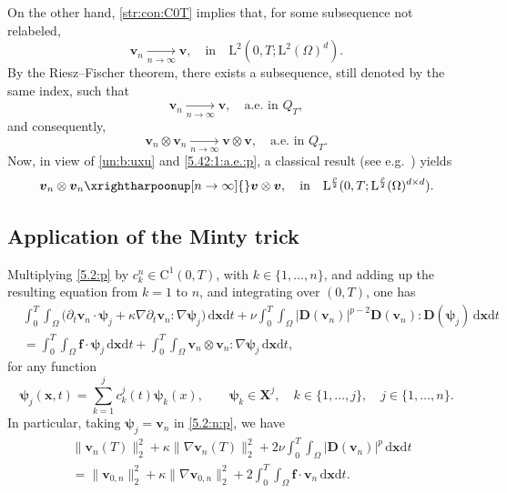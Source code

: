 \documentclass[12pt,reqno]{amsart}
\numberwithin{equation}{section}
\theoremstyle{definition}
\def\1{\Omega}
\def\dxt{\,\mathrm{d}\boldsymbol{x}\mathrm{d}t}
\def\L{\mathrm{L}}
\def\vv{\boldsymbol{v}}
\def\f{\boldsymbol{f}}
\def\C{\mathrm{C}}
\def\x{\boldsymbol{x}}
\def\bfX{\mathbf{X}}
\def\bfD{\mathbf{D}}
\def\bfX{\mathbf{X}}
\def\bpsi{\boldsymbol{\psi}}
\begin{document}
{
On the other hand, \eqref{str:con:C0T} implies that, for some subsequence not relabeled,
\begin{equation}\label{str:conv:Ls}
	\vv_n \xrightarrow[n \to \infty]{} \vv,
	\quad \text{in} \quad \L^2(0,T;\L^2(\Omega)^d).
\end{equation}
}
By the Riesz--Fischer theorem, there exists a subsequence, still denoted by the same index, such that
\begin{equation*}
	\vv_n \xrightarrow[n \to \infty]{} \vv, \quad \text{a.e. in } Q_T,
\end{equation*}
and consequently,
\begin{equation}\label{5.42:1:a.e.:p}
	\vv_n \otimes \vv_n \xrightarrow[n \to \infty]{} \vv \otimes \vv, \quad \text{a.e. in } Q_T.
\end{equation}
Now, in view of \eqref{un:b:uxu} and \eqref{5.42:1:a.e.:p}, a classical result (see e.g.~\cite[Lemma~1.3]{Lions:1969}) yields
\begin{equation}\label{lim:uxu}
	\vv_n \otimes \vv_n \xrightharpoonup[n \to \infty]{} \vv \otimes \vv, \quad \text{in} \quad \L^{\frac{\rho}{2}}(0,T;\L^{\frac{\rho}{2}}(\1)^{d \times d}).
\end{equation}


\subsection{Application of the Minty trick}\label{MT}

Multiplying \eqref{5.2:p} by $c_k^n\in\C^1(0,T)$, with $k\in\{1,\dots,n\}$, and adding up the resulting equation from $k=1$ to $n$, and integrating over $(0,T)$, one has
\begin{equation}\label{5.2:n:p}%
\begin{split}
&
\!\int_{0}^{T}\!\!\!\!\int_{\Omega}\big({\partial_t\vv_{n}}\cdot\bpsi_j  + \kappa\nabla{\partial_t\vv_{n}}:\nabla\bpsi_j\big)\dxt +
\nu\!\int_{0}^{T}\!\!\!\!\int_{\Omega}|\bfD(\vv_n)|^{p-2}\bfD(\vv_n):\bfD(\bpsi_j)\dxt\\
& =
\!\int_{0}^{T}\!\!\!\!\int_{\Omega}\f\cdot\bpsi_j\dxt + \!\int_{0}^{T}\!\!\!\!\int_{\Omega}\vv_n\otimes\vv_n:\nabla\bpsi_j\dxt,
\end{split}
\end{equation}
for any function
\begin{equation*}
\bpsi_j(\x,t)=\sum\limits_{k=1}^j{c_k^j(t)}\bpsi_{k}(x),\qquad \bpsi_{k}\in \bfX^j,\quad k\in\{1,\dots,j\},\quad  j\in\{1,\dots,n\}.
\end{equation*}
In particular, taking $\bpsi_j=\vv_n$ in \eqref{5.2:n:p}, we have
\begin{equation}\label{5.2:un:p}
  \begin{split}
  & \|\vv_n(T)\|^2_{2}+\kappa\|\nabla\vv_n(T)\|_{2}^2+2\nu \!\int_{0}^{T}\!\!\!\!\int_{\Omega}|\bfD(\vv_n)|^p \dxt\\ &=
   \|\vv_{0,n}\|^2_{2}+\kappa\|\nabla\vv_{0,n}\|_{2}^2+2\!\int_{0}^{T}\!\!\!\!\int_{\Omega}\f\cdot\vv_n \dxt.
  \end{split}
\end{equation}
\end{document}
